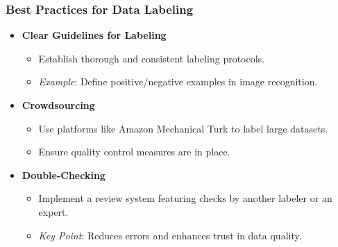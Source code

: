 \documentclass[aspectratio=169]{beamer}
\begin{document}
\begin{frame}[fragile]
    \frametitle{Best Practices for Data Labeling}
    \begin{itemize}
        \item \textbf{Clear Guidelines for Labeling}
            \begin{itemize}
                \item Establish thorough and consistent labeling protocols.
                \item \textit{Example}: Define positive/negative examples in image recognition.
            \end{itemize}
        \item \textbf{Crowdsourcing}
            \begin{itemize}
                \item Use platforms like Amazon Mechanical Turk to label large datasets.
                \item Ensure quality control measures are in place.
            \end{itemize}
        \item \textbf{Double-Checking}
            \begin{itemize}
                \item Implement a review system featuring checks by another labeler or an expert.
                \item \textit{Key Point}: Reduces errors and enhances trust in data quality.
            \end{itemize}
    \end{itemize}
\end{frame}
\end{document}

